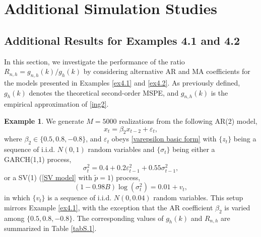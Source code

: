 \documentclass[ejsv2]{imsart}
\theoremstyle{plain}
\theoremstyle{definition}
\newtheorem{example}{Example}[section]
\theoremstyle{remark}
\newtheorem{remark}{Remark}[section]
\begin{document}

\section{Additional Simulation Studies}\label{sec:add sim}
\subsection{Additional Results for Examples 4.1 and 4.2}\label{sec:add sim ex4.1 4.2}
In this section, we investigate the performance of the ratio $R_{n,h}=g_{n,h}(k)/g_{h}(k)$ by considering alternative AR and MA coefficients for the models presented in Examples \ref{ex4.1} and \ref{ex4.2}. As previously defined, $g_{h}(k)$ denotes the theoretical second-order MSPE, and $g_{n,h}(k)$ is the empirical approximation of \eqref{ing2}.

\begin{example}\label{exS.1}
We generate $M=5000$ realizations from the following AR(2) model,
\begin{equation*}%
x_t=\beta_2 x_{t-2}+\varepsilon_t,
\end{equation*}
where $\beta_2 \in \{0.5, 0.8, -0.8\}$, and 
$\varepsilon_t$ obeys
\eqref{varepsilon basic form} with $\{z_t\}$ being a sequence of
i.i.d. $N(0,1)$ random variables
and $\{\sigma_t\}$ being either a GARCH(1,1) process,
\begin{equation*}
\sigma_t^2=0.4+0.2\varepsilon_{t-1}^2+0.55\sigma_{t-1}^2,
\end{equation*}
or a SV(1) (\eqref{SV model} with $\tilde{p}=1$) process,
\begin{equation*}
(1-0.98B)\log(\sigma_t^2)=0.01+v_t,
\end{equation*}
in which
$\{v_t\}$ is a sequence of i.i.d. $N(0,0.04)$ random variables. This setup mirrors Example \ref{ex4.1}, with the exception that the AR coefficient $\beta_2$ is varied among $\{0.5, 0.8, -0.8\}$. The corresponding values of $g_{h}(k)$ and $R_{n,h}$ are summarized in Table \ref{tabS.1}.
\end{example}
\end{document}
